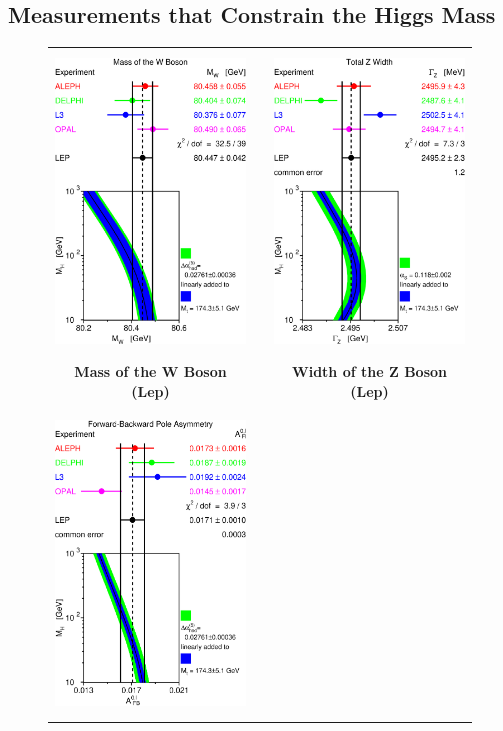 \documentclass[12pt]{article}
\def\lep{{\sc Lep}}
\begin{document}
\subsection{Measurements that Constrain the Higgs Mass}

\begin{figure}
  \begin{center}
    \begin{tabular}{c p{0.5cm} c}
      \includegraphics[height=8cm]{s02_mw.eps} & &
      \includegraphics[height=8cm]{lep1_gz.eps} \\
      {\bf Mass of the W Boson (\lep)} & & {\bf Width of the Z Boson (\lep)} \\
      & \vspace{0.5cm} & \\
      \includegraphics[height=8cm]{lep1_al.eps} & &

\end{tabular}
\end{center}
\end{figure}
\end{document}
